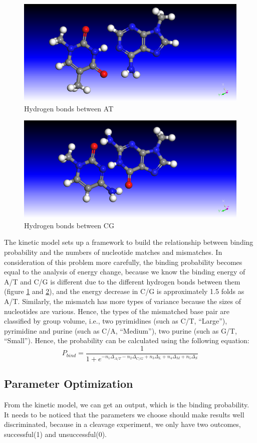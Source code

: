 \begin{figure}[H]
	\centering
	\includegraphics[width=0.7\linewidth]{AT}
	\caption{Hydrogen bonds between AT}
	\label{fig:6}
\end{figure}
\begin{figure}[H]
	\centering
	\includegraphics[width=0.7\linewidth]{CG}
	\caption{Hydrogen bonds between CG}
	\label{fig:7}
\end{figure}

The kinetic model sets up a framework to build the relationship between binding probability and the numbers of nucleotide matches and mismatches. In consideration of this problem more carefully, the binding probability becomes equal to the analysis of energy change, because we know the binding energy of A/T and C/G is different due to the different hydrogen bonds between them (figure \ref{fig:6} and \ref{fig:7}), and the energy decrease in C/G is approximately 1.5 folds as A/T. Similarly, the mismatch has more types of variance because the sizes of nucleotides are various. Hence, the types of the mismatched base pair are classified by group volume, i.e., two pyrimidines (such as C/T, “Large”), pyrimidine and purine (such as C/A, “Medium”), two purine (such as G/T, “Small”). Hence, the probability can be calculated using the following equation:
\begin{equation}
P_{bind}=\frac{1}{1+e^{-n_1\Delta_{A/T}-n_2\Delta_{C/G}+n_3\Delta_{L}+n_4\Delta_{M}+n_5\Delta_{S}}}
\end{equation}

\subsection{Parameter Optimization}
From the kinetic model, we can get an output, which is the binding probability. It needs to be noticed that the parameters we choose should make results well discriminated, because in a cleavage experiment, we only have two outcomes, successful(1) and unsuccessful(0). 

